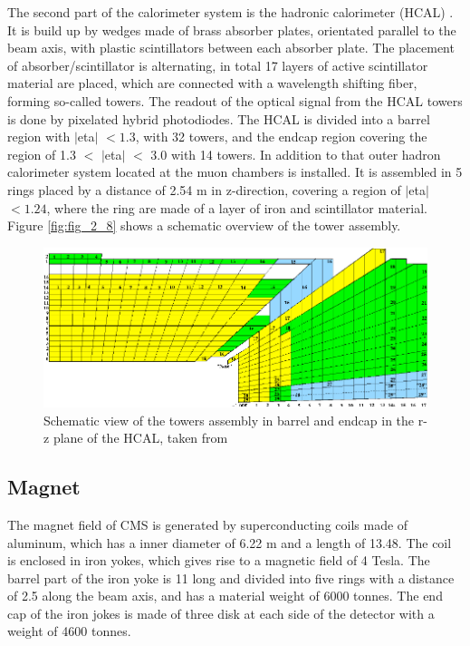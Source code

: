 The second part of the calorimeter system is the hadronic calorimeter (\gls{HCAL}) \cite{CMS2, HCAL}. It is build up by wedges made of brass absorber plates, orientated parallel to the beam axis, with plastic scintillators between each absorber plate. The placement of absorber/scintillator is alternating, in total 17 layers of active scintillator material are placed, which are connected with a wavelength shifting fiber, forming so-called towers. The readout of the optical signal from the HCAL towers is done by pixelated hybrid photodiodes. The \gls{HCAL} is divided into a barrel region with $|$\gls{eta}$|$ $< 1.3$, with 32 towers, and the endcap region covering the region of 1.3 $<$ $|$\gls{eta}$|$ $<$ 3.0 with 14 towers. In addition to that outer hadron calorimeter system located at the muon chambers is installed. It is assembled in 5 rings placed by a distance of 2.54 m in z-direction, covering a region of $|$\gls{eta}$|$ $< 1.24$, where the ring are made of a layer of iron and scintillator material. Figure \ref{fig:fig_2_8} shows a schematic overview of the tower assembly. \\

\begin{figure}[ht]
	\centering
	\includegraphics[width=1\textwidth]{pictures/HCAL.pdf}

	\caption[Hadronic calorimeter of CMS]{Schematic view of the towers assembly in barrel and endcap in the r-z plane of the \gls{HCAL}, taken from \cite{CMS2}}
	\label{fig:fig_2_9}
\end{figure}

\subsection*{Magnet}

The magnet field of \gls{CMS} is generated by superconducting coils made of aluminum, which has a inner diameter of 6.22 m and a length of 13.48. The coil is enclosed in iron yokes, which gives rise to a magnetic field of 4 Tesla. The barrel part of the iron yoke is 11 long and divided into five rings with a distance of 2.5 along the beam axis, and has a material weight of 6000 tonnes. The end cap of the iron jokes is made of three disk at each side of the detector with a weight of 4600 tonnes.

